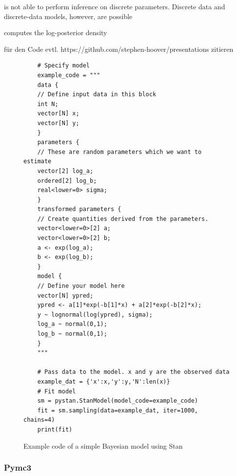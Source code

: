 \documentclass{article}
\begin{document}
is not able to perform inference on discrete parameters. Discrete data and discrete-data models, however, are possible

computes the log-posterior density

\cite{Gelman_2015}

\cite{Hoover2016}

für den Code evtl. https://github.com/stephen-hoover/presentations zitieren

\begin{figure}
	\begin{lstlisting}
	# Specify model
	example_code = """
	data {
	// Define input data in this block
	int N;
	vector[N] x;
	vector[N] y;
	}
	parameters {
	// These are random parameters which we want to estimate
	vector[2] log_a;
	ordered[2] log_b;
	real<lower=0> sigma;
	}
	transformed parameters {
	// Create quantities derived from the parameters.
	vector<lower=0>[2] a;
	vector<lower=0>[2] b;
	a <- exp(log_a);
	b <- exp(log_b);
	}
	model {
	// Define your model here
	vector[N] ypred;
	ypred <- a[1]*exp(-b[1]*x) + a[2]*exp(-b[2]*x);
	y ~ lognormal(log(ypred), sigma);
	log_a ~ normal(0,1); 
	log_b ~ normal(0,1);
	}
	"""
	
	# Pass data to the model. x and y are the observed data
	example_dat = {'x':x,'y':y,'N':len(x)}
	# Fit model
	sm = pystan.StanModel(model_code=example_code)
	fit = sm.sampling(data=example_dat, iter=1000, chains=4)
	print(fit)
	\end{lstlisting}
	\label{fig:stan_example_code}
	\caption[Example code of a simple Bayesian model using Stan]{Example code of a simple Bayesian model using Stan}
\end{figure}

\subsubsection{Pymc3}
\end{document}
